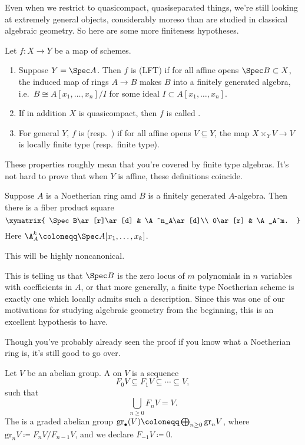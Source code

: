 Even when we restrict to quasicompact, quasiseparated things, we're still looking at extremely general objects,
considerably moreso than are studied in classical algebraic geometry. So here are some more finiteness hypotheses.
\begin{defn}
Let $f\colon X\to Y$ be a map of schemes.
\begin{enumerate}
	\item Suppose $Y = \Spec A$. Then $f$ is  (LFT) if for all affine opens $\Spec
	B\subset X$, the induced map of rings $A\to B$ makes $B$ into a finitely generated algebra, i.e.\ $B\cong
	A[x_1,\dotsc,x_n]/I$ for some ideal $I\subset A[x_1,\dotsc,x_n]$.
	\item If in addition $X$ is quasicompact, then $f$ is called .
	\item For general $Y$, $f$ is  (resp.\ ) if for all affine opens
	$V\subseteq Y$, the map $X\times_Y V\to V$ is locally finite type (resp.\ finite type).
\end{enumerate}
\end{defn}
These properties roughly mean that you're covered by finite type algebras. It's not hard to prove that when $Y$ is
affine, these definitions coincide.
\begin{thm}
\label{hilbbasis}
Suppose $A$ is a Noetherian ring amd $B$ is a finitely generated $A$-algebra. Then there is a fiber product square
\[\xymatrix{
	\Spec B\ar[r]\ar[d] & \A^n_A\ar[d]\\
	0\ar[r] & \A_A^m.
}\]
Here $\A_A^k\coloneqq\Spec A[x_1,\dotsc,x_k]$.
\end{thm}
This will be highly noncanonical.
\begin{rem}
This is telling us that $\Spec B$ is the zero locus of $m$ polynomials in $n$ variables with coefficients in $A$,
or that more generally, a finite type Noetherian scheme is exactly one which locally admits such a description.
Since this was one of our motivations for studying algebraic geometry from the beginning, this is an excellent
hypothesis to have.
\end{rem}
Though you've probably already seen the proof if you know what a Noetherian ring is, it's still good to go over.
\begin{defn}
Let $V$ be an abelian group. A  on $V$ is a sequence
\begin{equation}
	F_0V\subseteq F_1V\subseteq\dotsb\subseteq V,
\end{equation}
such that
\begin{equation}
	\bigcup_{n\ge 0} F_nV = V.
\end{equation}
The  is a graded abelian group $\gr_\bullet(V)\coloneqq \bigoplus_{n\ge 0}\mathrm{gr}_n V$,
where $\mathrm{gr}_nV \coloneqq F_nV/F_{n-1}V$, and we declare $F_{-1}V\coloneqq 0$.
\end{defn}
